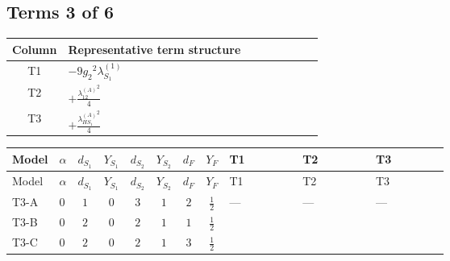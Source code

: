 \documentclass[8pt]{article}
\begin{document}
\begin{landscape}
\subsection*{Terms 3 of 6}
\begin{center}
\begin{tabular}{@{}c >{\raggedright\arraybackslash}p{0.82\linewidth}@{}}
\toprule
Column & Representative term structure \\
\midrule
T1 & \(\displaystyle -9 {g_2}^2 {\lambda_{S_1}^{(1)}}\) \\
\midrule
T2 & \(\displaystyle +\frac{{\lambda_{12}^{(A)}}^2}{4}\) \\
\midrule
T3 & \(\displaystyle +\frac{{\lambda_{HS_1}^{(A)}}^2}{4}\) \\
\midrule
\bottomrule
\end{tabular}
\end{center}
\smallskip
\tiny
\begin{longtable}{@{}llcccccc >{\raggedright\arraybackslash}p{0.21\linewidth} >{\raggedright\arraybackslash}p{0.21\linewidth} >{\raggedright\arraybackslash}p{0.21\linewidth}@{}}
\toprule
Model & $\alpha$ & $d_{S_1}$ & $Y_{S_1}$ & $d_{S_2}$ & $Y_{S_2}$ & $d_F$ & $Y_F$ & T1 & T2 & T3 \\
\midrule
\endfirsthead
\toprule
Model & $\alpha$ & $d_{S_1}$ & $Y_{S_1}$ & $d_{S_2}$ & $Y_{S_2}$ & $d_F$ & $Y_F$ & T1 & T2 & T3 \\
\midrule
\endhead
T3-A & $0$ & $1$ & $0$ & $3$ & $1$ & $2$ & $\frac{1}{2}$ & --- & --- & --- \\
\midrule
T3-B & $0$ & $2$ & $0$ & $2$ & $1$ & $1$ & $\frac{1}{2}$ & \scriptsize\adjustbox{max width=\linewidth}{$\begin{gathered} -9 {g_2}^2 {\lambda_{S_1}^{(1)}}\end{gathered}$} & \scriptsize\adjustbox{max width=\linewidth}{$\begin{gathered} +\frac{{\lambda_{12}^{(A)}}^2}{4}\end{gathered}$} & \scriptsize\adjustbox{max width=\linewidth}{$\begin{gathered} +\frac{{\lambda_{HS_1}^{(A)}}^2}{4}\end{gathered}$} \\
\midrule
T3-C & $0$ & $2$ & $0$ & $2$ & $1$ & $3$ & $\frac{1}{2}$ & \scriptsize\adjustbox{max width=\linewidth}{$\begin{gathered} -9 {g_2}^2 {\lambda_{S_1}^{(1)}}\end{gathered}$} & \scriptsize\adjustbox{max width=\linewidth}{$\begin{gathered} +\frac{{\lambda_{12}^{(A)}}^2}{4}\end{gathered}$} & \scriptsize\adjustbox{max width=\linewidth}{$\begin{gathered} +\frac{{\lambda_{HS_1}^{(A)}}^2}{4}\end{gathered}$} \\

\end{longtable}
\end{landscape}
\end{document}
